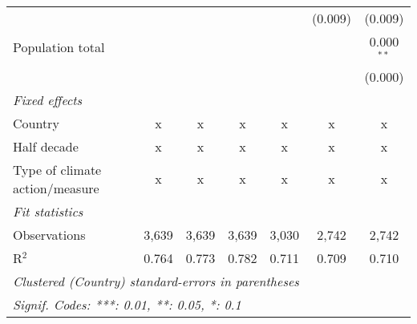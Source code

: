 \begin{tabular}{lcccccc}
                                                                                &         &                &                &                & (0.009)        & (0.009)\\   
   Population total                                                             &         &                &                &                &                & 0.000$^{**}$\\   
                                                                                &         &                &                &                &                & (0.000)\\   
   \emph{Fixed effects}\\
   Country                                                                      & x       & x              & x              & x              & x              & x\\  
   Half decade                                                                  & x       & x              & x              & x              & x              & x\\  
   Type of climate action/measure                                               & x       & x              & x              & x              & x              & x\\  
   \midrule \emph{Fit statistics}\\
   Observations                                                                 & 3,639   & 3,639          & 3,639          & 3,030          & 2,742          & 2,742\\  
   R$^2$                                                                        & 0.764   & 0.773          & 0.782          & 0.711          & 0.709          & 0.710\\  
   \midrule
   \multicolumn{7}{l}{\emph{Clustered (Country) standard-errors in parentheses}}\\
   \multicolumn{7}{l}{\emph{Signif. Codes: ***: 0.01, **: 0.05, *: 0.1}}\\
\end{tabular}
\par\endgroup


